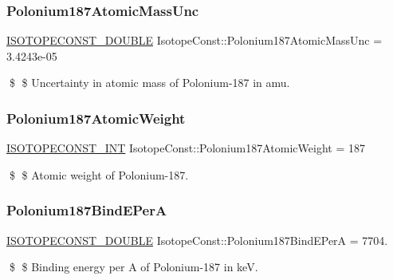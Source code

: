 \subsubsection{\texorpdfstring{Polonium187\+Atomic\+Mass\+Unc}{Polonium187AtomicMassUnc}}
{\footnotesize\ttfamily \mbox{\hyperlink{group___isotope_const-_macros_ga8f45a7272ce02c0b4c65c44636ed719a}{I\+S\+O\+T\+O\+P\+E\+C\+O\+N\+S\+T\+\_\+\+D\+O\+U\+B\+LE}} Isotope\+Const\+::\+Polonium187\+Atomic\+Mass\+Unc = 3.\+4243e-\/05}

\$ \$ Uncertainty in atomic mass of Polonium-\/187 in amu. \mbox{\label{group___isotope_const-_polonium-_po187_gaa973b924277280133bff9de9d4cb3b74}} 
\subsubsection{\texorpdfstring{Polonium187\+Atomic\+Weight}{Polonium187AtomicWeight}}
{\footnotesize\ttfamily \mbox{\hyperlink{group___isotope_const-_macros_ga5f18360b3e99483a35c32d789e62621c}{I\+S\+O\+T\+O\+P\+E\+C\+O\+N\+S\+T\+\_\+\+I\+NT}} Isotope\+Const\+::\+Polonium187\+Atomic\+Weight = 187}

\$ \$ Atomic weight of Polonium-\/187. \mbox{\label{group___isotope_const-_polonium-_po187_gae97e602bee6be5bdfe50f4df845a83ce}} 
\subsubsection{\texorpdfstring{Polonium187\+Bind\+E\+PerA}{Polonium187BindEPerA}}
{\footnotesize\ttfamily \mbox{\hyperlink{group___isotope_const-_macros_ga8f45a7272ce02c0b4c65c44636ed719a}{I\+S\+O\+T\+O\+P\+E\+C\+O\+N\+S\+T\+\_\+\+D\+O\+U\+B\+LE}} Isotope\+Const\+::\+Polonium187\+Bind\+E\+PerA = 7704.}

\$ \$ Binding energy per A of Polonium-\/187 in keV. \mbox{\label{group___isotope_const-_polonium-_po187_ga00dece971317ce00cd13f1708b275ace}} 
